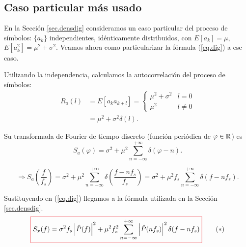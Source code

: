 \subsection*{Caso particular más usado}

En la Sección \ref{sec.densdig} consideramos un caso particular del proceso de símbolos: $\{a_k\}$ independientes, idénticamente distribuidos, con $E[a_k]=\mu$, $E[a_k^2]=\mu^2+\sigma^2$.
Veamos ahora como particularizar la fórmula (\ref{eq.dig}) a ese caso.

Utilizando la independencia, calculamos la autocorrelación del proceso de símbolos:
\begin{align*}
R_a(l) &= E[a_k a_{k+l}]= \begin{cases}
                                        \mu^2+\sigma^2 & l = 0\\
                                        \mu^2 & l\neq 0
                                       \end{cases} \\
                                       &= \mu^2+\sigma^2\delta(l).
\end{align*}

Su transformada de Fourier de tiempo discreto (función periódica de $\varphi\in\mathbb{R}$) es
\[
  S_a(\varphi) = \sigma^2 + \mu^2 \sum_{n=-\infty}^{+\infty}\delta(\varphi - n).
\]

\[\Rightarrow  S_a\left(\frac{f}{f_s}\right) = \sigma^2+\mu^2\sum_{n=-\infty}^{+\infty} \delta\left(\frac{f-nf_s}{f_s}\right) = \sigma^2+\mu^2 f_s \sum_{n=-\infty}^{+\infty} \delta (f-nf_s).\]

Sustituyendo en (\ref{eq.dig}) llegamos a la fórmula utilizada en la Sección \ref{sec.densdig}.
\begin{equation}
    \label{eq:dig3}
    {\color{Red}\boxed{\normalcolor S_x(f) = \sigma^2 f_s \left|\hat{P}(f)\right|^2 + \mu^2 f_s^2 \sum_{n=-\infty}^{+\infty} \left|\hat{P}(nf_s)\right|^2\delta(f-nf_s)}}\tag{\textasteriskcentered}
\end{equation} 